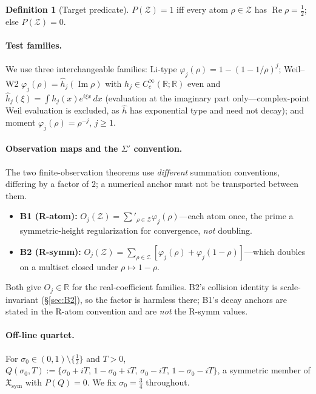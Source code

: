 \documentclass[11pt]{article}
\theoremstyle{plain}
\theoremstyle{definition}
\newtheorem{definition}{Definition}
\theoremstyle{remark}
\newcommand{\Xsym}{\mathfrak{X}_{\mathrm{sym}}}
\newcommand{\hhat}{\widehat{h}}
\begin{document}
\begin{definition}[Target predicate]
$P(\mathcal Z)=1$ iff every atom $\rho\in\mathcal Z$ has $\operatorname{Re}\rho=\tfrac12$; else
$P(\mathcal Z)=0$.
\end{definition}

\paragraph{Test families.} We use three interchangeable families:
Li-type $\varphi_j(\rho)=1-(1-1/\rho)^j$; Weil--W2 $\varphi_j(\rho)=\hhat_j(\operatorname{Im}\rho)$ with
$h_j\in C_c^\infty(\mathbb R;\mathbb R)$ even and
$\hhat_j(\xi)=\int h_j(x)e^{i\xi x}\,dx$ (evaluation at the imaginary part only---complex-point
Weil evaluation is excluded, as $\hhat$ has exponential type and need not decay); and moment
$\varphi_j(\rho)=\rho^{-j}$, $j\ge 1$.

\paragraph{Observation maps and the $\Sigma'$ convention.} The two finite-observation theorems
use \emph{different} summation conventions, differing by a factor of $2$; a numerical anchor
must not be transported between them.
\begin{itemize}
  \item \textbf{B1 (R-atom):} $O_j(\mathcal Z)=\sum'_{\rho\in\mathcal Z}\varphi_j(\rho)$---each
  atom once, the prime a symmetric-height regularization for convergence, \emph{not} doubling.
  \item \textbf{B2 (R-symm):} $O_j(\mathcal Z)=\sum_{\rho\in\mathcal
  Z}[\varphi_j(\rho)+\varphi_j(1-\rho)]$---which doubles on a multiset closed under
  $\rho\mapsto 1-\rho$.
\end{itemize}
Both give $O_j\in\mathbb R$ for the real-coefficient families. B2's collision identity is
scale-invariant (\S\ref{sec:B2}), so the factor is harmless there; B1's decay anchors are
stated in the R-atom convention and are \emph{not} the R-symm values.

\paragraph{Off-line quartet.} For $\sigma_0\in(0,1)\setminus\{\tfrac12\}$ and $T>0$,
$Q(\sigma_0,T):=\{\sigma_0+iT,\,1-\sigma_0+iT,\,\sigma_0-iT,\,1-\sigma_0-iT\}$, a symmetric
member of $\Xsym$ with $P(Q)=0$. We fix $\sigma_0=\tfrac34$ throughout.
\end{document}
